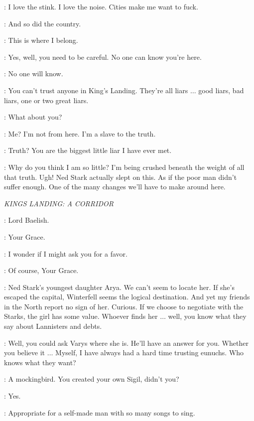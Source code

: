 \SHAE: I love the stink. I love the noise. Cities make me want to fuck.

\TYRION: And so did the country.

\SHAE: This is where I belong.

\TYRION: Yes, well, you need to be careful. No one can know you're here.

\SHAE: No one will know.

\TYRION: You can't trust anyone in King's Landing. They're all liars $\ldots$ good liars, bad liars, one or two great liars.

\SHAE: What about you?

\TYRION: Me? I'm not from here. I'm a slave to the truth.

\SHAE: Truth? You are the biggest little liar I have ever met.

\TYRION: Why do you think I am so little? I'm being crushed beneath the weight of all that truth.  Ugh! Ned Stark actually slept on this. As if the poor man didn't suffer enough. One of the many changes we'll have to make around here.


\scene

\textit{KINGS LANDING: A CORRIDOR}


\CERSEI: Lord Baelish.

\LITTLEFINGER: Your Grace.

\CERSEI: I wonder if I might ask you for a favor.

\LITTLEFINGER: Of course, Your Grace.

\CERSEI: Ned Stark's youngest daughter Arya. We can't seem to locate her. If she's escaped the capital, Winterfell seems the logical destination. And yet my friends in the North report no sign of her. Curious. If we choose to negotiate with the Starks, the girl has some value. Whoever finds her $\ldots$ well, you know what they say about Lannisters and debts.

\LITTLEFINGER: Well, you could ask Varys where she is. He'll have an answer for you. Whether you believe it $\ldots$ Myself, I have always had a hard time trusting eunuchs. Who knows what they want?

\CERSEI: A mockingbird. You created your own Sigil, didn't you?

\LITTLEFINGER: Yes.

\CERSEI: Appropriate for a self-made man with so many songs to sing.

